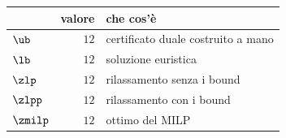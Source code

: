 \begin{center}\small
\begin{tabular}{lrl}
\toprule
 & valore & che cos'è \\
\midrule
$\ub$ & $12$ & certificato duale costruito a mano \\
$\lb$ & $12$ & soluzione euristica \\
$\zlp$ & $12$ & rilassamento senza i bound \\
$\zlpp$ & $12$ & rilassamento con i bound \\
$\zmilp$ & $12$ & ottimo del MILP \\
\bottomrule
\end{tabular}
\end{center}

